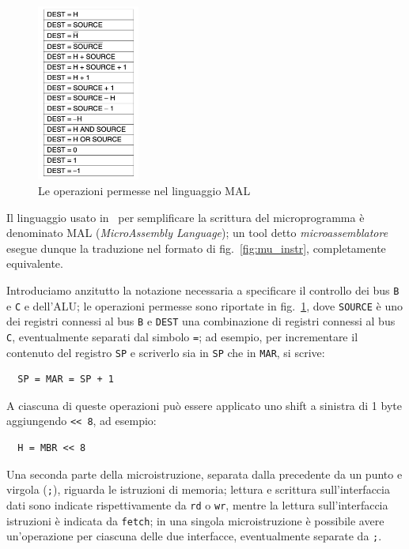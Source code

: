 \documentclass[a4paper,12pt]{scrreprt}
\begin{document}
\begin{figure}
  \centering
  \includegraphics[width=0.3\textwidth]{mal_ops.png}
  \caption{Le operazioni permesse nel linguaggio MAL}\label{fig:mal_ops}
\end{figure}

Il linguaggio usato in~\cite{tanenbaum} per semplificare la scrittura del
microprogramma è denominato MAL (\textit{MicroAssembly Language}); un tool detto
\textit{microassemblatore} esegue dunque la traduzione nel formato di
fig.~\ref{fig:mu_instr}, completamente equivalente.

Introduciamo anzitutto la notazione necessaria a specificare il controllo dei
bus \lstinline{B} e \lstinline{C} e dell'ALU; le operazioni permesse sono
riportate in fig.~\ref{fig:mal_ops}, dove \lstinline{SOURCE} è uno dei registri
connessi al bus \lstinline{B} e \lstinline{DEST} una combinazione di registri
connessi al bus \lstinline{C}, eventualmente separati dal simbolo \lstinline{=};
ad esempio, per incrementare il contenuto del registro \lstinline{SP} e
scriverlo sia in \lstinline{SP} che in \lstinline{MAR}, si scrive:

\begin{lstlisting}
  SP = MAR = SP + 1
\end{lstlisting}

A ciascuna di queste operazioni può essere applicato uno shift a sinistra di 1 byte
aggiungendo \lstinline{<< 8}, ad esempio:

\begin{lstlisting}
  H = MBR << 8
\end{lstlisting}

Una seconda parte della microistruzione, separata dalla precedente da un punto e
virgola (\lstinline{;}), riguarda le istruzioni di memoria; lettura e scrittura
sull'interfaccia dati sono indicate rispettivamente da \lstinline{rd} o
\lstinline{wr}, mentre la lettura sull'interfaccia istruzioni è indicata da
\lstinline{fetch}; in una singola microistruzione è possibile avere
un'operazione per ciascuna delle due interfacce, eventualmente separate da
\lstinline{;}.
\end{document}
